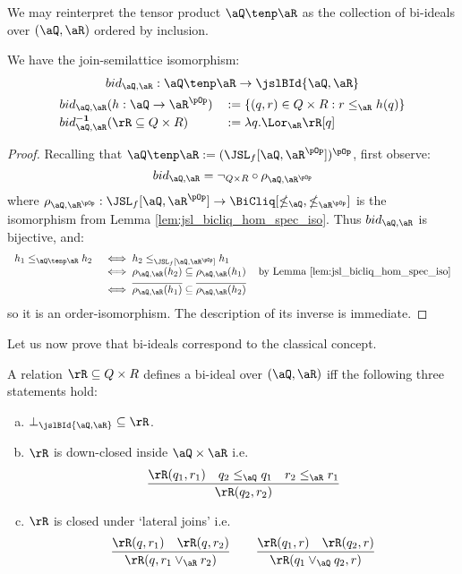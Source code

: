 \documentclass{article}
\begin{document}
We may reinterpret the tensor product $\aQ \tenp \aR$ as the collection of bi-ideals over $(\aQ,\aR)$ ordered by inclusion.

\begin{lemma}
\label{lem:tenp_as_bi_ideals}
\item
We have the join-semilattice isomorphism:
\[
\begin{tabular}{c}
$bid_{\aQ,\aR} : \aQ \tenp \aR \to \jslBId{\aQ,\aR}$
\\[1ex]
\begin{tabular}{ll}
$bid_{\aQ,\aR}(h : \aQ \to \aR^{\pOp})$ & $:= \{ (q,r) \in Q \times R : r \leq_\aR h(q) \}$
\\[0.5ex]
$bid_{\aQ,\aR}^{\bf-1}(\rR \subseteq Q \times R)$ & $:= \lambda q. \Lor_\aR \rR[q]$
\end{tabular}
\end{tabular}
\]
\end{lemma}

\begin{proof}
Recalling that $\aQ \tenp \aR := (\JSL_f[\aQ,\aR^{\pOp}])^{\pOp}$, first observe:
\[
bid_{\aQ,\aR} = \neg_{Q \times R} \circ \rho_{\aQ,\aR^{\pOp}}
\]
where $\rho_{\aQ,\aR^{\pOp}} : \JSL_f[\aQ,\aR^{\pOp}] \to \BiCliq[\nleq_\aQ,\nleq_{\aR^{\pOp}}]$ is the isomorphism from Lemma \ref{lem:jsl_bicliq_hom_spec_iso}.  Thus $bid_{\aQ,\aR}$ is bijective, and:
\[
\begin{tabular}{lll}
$h_1 \leq_{\aQ \tenp \aR} h_2$
&
$\iff h_2 \leq_{\JSL_f[\aQ,\aR^{\pOp}]} h_1$
\\&
$\iff \rho_{\aQ, \aR}(h_2) \subseteq \rho_{\aQ,\aR}(h_1)$
& by Lemma \ref{lem:jsl_bicliq_hom_spec_iso}
\\[1ex]&
$\iff \overline{\rho_{\aQ, \aR}(h_1)} \subseteq \overline{\rho_{\aQ,\aR}(h_2)}$
\end{tabular}
\]
so it is an order-isomorphism. The description of its inverse is immediate.
\end{proof}

Let us now prove that bi-ideals correspond to the classical concept.

\begin{lemma}
\label{lem:bi_ideal_classical}
\item
A relation $\rR \subseteq Q \times R$ defines a bi-ideal over $(\aQ,\aR)$ iff the following three statements hold:
\begin{enumerate}[(a)]
\item
$\bot_{\jslBId{\aQ,\aR}} \subseteq \rR$.
\item
$\rR$ is down-closed inside $\aQ \times \aR$ i.e.\
\[
\dfrac{\rR(q_1,r_1) \quad q_2 \leq_\aQ q_1 \quad r_2 \leq_\aR r_1}
{\rR(q_2,r_2)}
\]

\item
$\rR$ is closed under `lateral joins' i.e.\
\[
\dfrac{\rR(q,r_1) \quad \rR(q,r_2)}{\rR(q,r_1 \lor_\aR r_2)}
\qquad
\dfrac{\rR(q_1,r) \quad \rR(q_2,r)}{\rR(q_1 \lor_\aQ q_2,r)}
\]
\end{enumerate}
\end{lemma}
\end{document}
